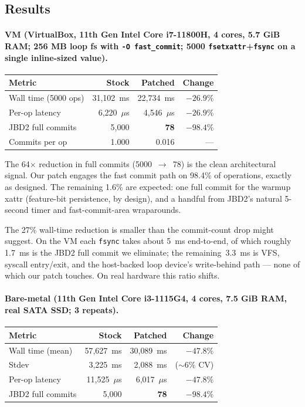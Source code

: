 \documentclass[12pt,a4paper]{article}
\begin{document}
\subsection{Results}

\paragraph{VM (VirtualBox, 11th Gen Intel Core i7-11800H, 4 cores,
5.7 GiB RAM; 256 MB loop fs with \texttt{-O fast\_commit}; 5000
\texttt{fsetxattr}+\texttt{fsync} on a single inline-sized value).}

\begin{center}
\begin{tabular}{lrrr}
\toprule
Metric & Stock & Patched & Change \\
\midrule
Wall time (5000 ops) & 31{,}102~ms & 22{,}734~ms & $-26.9\%$ \\
Per-op latency       & 6{,}220~$\mu$s & 4{,}546~$\mu$s & $-26.9\%$ \\
JBD2 full commits    & 5{,}000 & \textbf{78} & $\mathbf{-98.4\%}$ \\
Commits per op       & 1.000   & 0.016       & --- \\
\bottomrule
\end{tabular}
\end{center}

The 64$\times$ reduction in full commits (5000~$\to$~78) is the
clean architectural signal.  Our patch engages the fast commit
path on 98.4\% of operations, exactly as designed.  The remaining
1.6\% are expected: one full commit for the warmup xattr
(feature-bit persistence, by design), and a handful from JBD2's
natural 5-second timer and fast-commit-area wraparounds.

The 27\% wall-time reduction is smaller than the commit-count
drop might suggest.  On the VM each \texttt{fsync} takes about
5~ms end-to-end, of which roughly 1.7~ms is the JBD2 full commit
we eliminate; the remaining~3.3~ms is VFS, syscall entry/exit,
and the host-backed loop device's write-behind path --- none of
which our patch touches.  On real hardware this ratio shifts.

\paragraph{Bare-metal (11th Gen Intel Core i3-1115G4, 4 cores,
7.5 GiB RAM, real SATA SSD; 3 repeats).}

\begin{center}
\begin{tabular}{lrrr}
\toprule
Metric & Stock & Patched & Change \\
\midrule
Wall time (mean)     & 57{,}627~ms & 30{,}089~ms & $-47.8\%$ \\
Stdev                & 3{,}225~ms  & 2{,}088~ms  & (${\sim}6\%$ CV) \\
Per-op latency       & 11{,}525~$\mu$s & 6{,}017~$\mu$s & $-47.8\%$ \\
JBD2 full commits    & 5{,}000 & \textbf{78} & $\mathbf{-98.4\%}$ \\
\bottomrule
\end{tabular}
\end{center}
\end{document}
